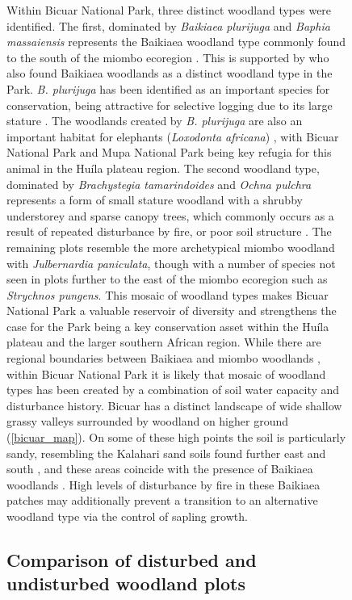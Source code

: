 \documentclass[diversity,article,submit,moreauthors,pdftex]{Definitions/mdpi}
\begin{document}
\begin{figure}[H]
Within Bicuar National Park, three distinct woodland types were identified. The first, dominated by \textit{Baikiaea plurijuga} and \textit{Baphia massaiensis} represents the Baikiaea woodland type commonly found to the south of the miombo ecoregion \citep{Timberlake2010}. This is supported by \citet{Chisingui2018} who also found Baikiaea woodlands as a distinct woodland type in the Park. \textit{B. plurijuga} has been identified as an important species for conservation, being attractive for selective logging due to its large stature \citep{Ngandwe2017, Wallenfang2015}. The woodlands created by \textit{B. plurijuga} are also an important habitat for elephants (\textit{Loxodonta africana}) \citep{Sianga2017, Mukwashi2012}, with Bicuar National Park and Mupa National Park being key refugia for this animal in the Hu\'{i}la plateau region. The second woodland type, dominated by \textit{Brachystegia tamarindoides} and \textit{Ochna pulchra} represents a form of small stature woodland with a shrubby understorey and sparse canopy trees, which commonly occurs as a result of repeated disturbance by fire, or poor soil structure \citep{Smith2004}. The remaining plots resemble the more archetypical miombo woodland with \textit{Julbernardia paniculata}, though with a number of species not seen in plots further to the east of the miombo ecoregion such as \textit{Strychnos pungens}. This mosaic of woodland types makes Bicuar National Park a valuable reservoir of diversity and strengthens the case for the Park being a key conservation asset within the Hu\'{i}la plateau and the larger southern African region. While there are regional boundaries between Baikiaea and miombo woodlands \citep{White1983}, within Bicuar National Park it is likely that mosaic of woodland types has been created by a combination of soil water capacity and disturbance history. Bicuar has a distinct landscape of wide shallow grassy valleys surrounded by woodland on higher ground (\autoref{bicuar_map}). On some of these high points the soil is particularly sandy, resembling the Kalahari sand soils found further east and south \citep{Huntley2019}, and these areas coincide with the presence of Baikiaea woodlands \citep{Campbell2002}. High levels of disturbance by fire in these Baikiaea patches may additionally prevent a transition to an alternative woodland type via the control of sapling growth.

\subsection{Comparison of disturbed and undisturbed woodland plots}


\end{figure}
\end{document}

